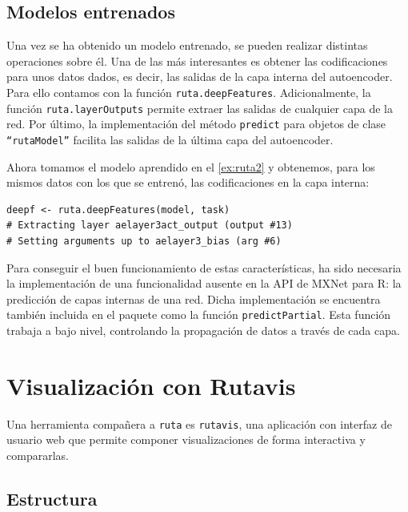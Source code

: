 \subsection{Modelos entrenados}

Una vez se ha obtenido  un modelo entrenado, se pueden realizar distintas operaciones sobre él. Una de las más interesantes es obtener las codificaciones para unos datos dados, es decir, las salidas de la capa interna del autoencoder. Para ello contamos con la función \texttt{ruta.deepFeatures}. Adicionalmente, la función \texttt{ruta.layerOutputs} permite extraer las salidas de cualquier capa de la red. Por último, la implementación del método \texttt{predict} para objetos de clase \texttt{``rutaModel''} facilita las salidas de la última capa del autoencoder.

\begin{example}
Ahora tomamos el modelo aprendido en el \autoref{ex:ruta2} y obtenemos, para los mismos datos con los que se entrenó, las codificaciones en la capa interna:
  \begin{lstlisting}
deepf <- ruta.deepFeatures(model, task)
# Extracting layer aelayer3act_output (output #13)
# Setting arguments up to aelayer3_bias (arg #6)
  \end{lstlisting}
\end{example}

Para conseguir el buen funcionamiento de estas características, ha sido necesaria la implementación de una funcionalidad ausente en la API de MXNet para R: la predicción de capas internas de una red. Dicha implementación se encuentra también incluida en el paquete como la función \texttt{predictPartial}. Esta función trabaja a bajo nivel, controlando la propagación de datos a través de cada capa.

\section{Visualización con Rutavis}\label{sec:rutavis}

Una herramienta compañera a \texttt{ruta} es \texttt{rutavis}, una
aplicación con interfaz de usuario web que permite componer
visualizaciones de forma interactiva y compararlas.

\subsection{Estructura}

